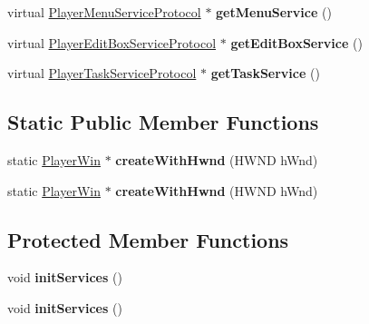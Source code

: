 \begin{DoxyCompactItemize}
virtual \hyperlink{classPlayerMenuServiceProtocol}{Player\+Menu\+Service\+Protocol} $\ast$ {\bfseries get\+Menu\+Service} ()
\item 
\mbox{\label{classPlayerWin_a683c07edd0b739a6abb3b8e28c869dd3}} 
virtual \hyperlink{classPlayerEditBoxServiceProtocol}{Player\+Edit\+Box\+Service\+Protocol} $\ast$ {\bfseries get\+Edit\+Box\+Service} ()
\item 
\mbox{\label{classPlayerWin_a58af58c3f8f2b109ca29a21fe77432f6}} 
virtual \hyperlink{classPlayerTaskServiceProtocol}{Player\+Task\+Service\+Protocol} $\ast$ {\bfseries get\+Task\+Service} ()
\end{DoxyCompactItemize}
\subsection*{Static Public Member Functions}
\begin{DoxyCompactItemize}
\item 
\mbox{\label{classPlayerWin_a747b162a1016a0546efc1be9456525ec}} 
static \hyperlink{classPlayerWin}{Player\+Win} $\ast$ {\bfseries create\+With\+Hwnd} (H\+W\+ND h\+Wnd)
\item 
\mbox{\label{classPlayerWin_a696d3cd734cc276084e8724e98e49556}} 
static \hyperlink{classPlayerWin}{Player\+Win} $\ast$ {\bfseries create\+With\+Hwnd} (H\+W\+ND h\+Wnd)
\end{DoxyCompactItemize}
\subsection*{Protected Member Functions}
\begin{DoxyCompactItemize}
\item 
\mbox{\label{classPlayerWin_afd2450e23d6eba71f5ba0791db4380d4}} 
void {\bfseries init\+Services} ()
\item 
\mbox{\label{classPlayerWin_afd2450e23d6eba71f5ba0791db4380d4}} 
void {\bfseries init\+Services} ()
\end{DoxyCompactItemize}
